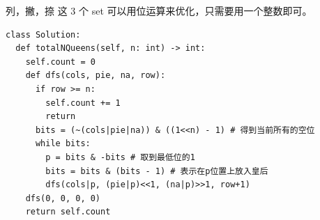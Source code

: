 列，撇，捺 这 3 个 set 可以用位运算来优化，只需要用一个整数即可。

\begin{verbatim}
class Solution:
  def totalNQueens(self, n: int) -> int:
    self.count = 0
    def dfs(cols, pie, na, row):
      if row >= n:
        self.count += 1
        return
      bits = (~(cols|pie|na)) & ((1<<n) - 1) # 得到当前所有的空位
      while bits:
        p = bits & -bits # 取到最低位的1
        bits = bits & (bits - 1) # 表示在p位置上放入皇后
        dfs(cols|p, (pie|p)<<1, (na|p)>>1, row+1)
    dfs(0, 0, 0, 0)
    return self.count
\end{verbatim}
